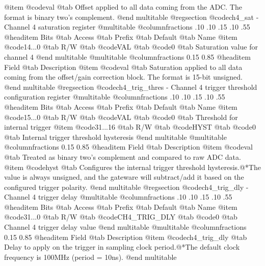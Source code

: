 @item @code{val} @tab Offset applied to all data coming from the ADC. The format is binary two's complement.
@end multitable
@regsection @code{ch4_sat} - Channel 4 saturation register
@multitable @columnfractions .10 .10 .15 .10 .55
@headitem Bits @tab Access @tab Prefix @tab Default @tab Name
@item @code{14...0}
@tab R/W @tab
@code{VAL}
@tab @code{0} @tab 
Saturation value for channel 4
@end multitable
@multitable @columnfractions 0.15 0.85
@headitem Field @tab Description
@item @code{val} @tab Saturation applied to all data coming from the offset/gain correction block. The format is 15-bit unsigned.
@end multitable
@regsection @code{ch4_trig_thres} - Channel 4 trigger threshold configuration register
@multitable @columnfractions .10 .10 .15 .10 .55
@headitem Bits @tab Access @tab Prefix @tab Default @tab Name
@item @code{15...0}
@tab R/W @tab
@code{VAL}
@tab @code{0} @tab 
Threshold for internal trigger
@item @code{31...16}
@tab R/W @tab
@code{HYST}
@tab @code{0} @tab 
Internal trigger threshold hysteresis
@end multitable
@multitable @columnfractions 0.15 0.85
@headitem Field @tab Description
@item @code{val} @tab Treated as binary two's complement and compared to raw ADC data.
@item @code{hyst} @tab Configures the internal trigger threshold hysteresis.@*The value is always unsigned, and the gateware will subtract/add it based on the configured trigger polarity.
@end multitable
@regsection @code{ch4_trig_dly} - Channel 4 trigger delay
@multitable @columnfractions .10 .10 .15 .10 .55
@headitem Bits @tab Access @tab Prefix @tab Default @tab Name
@item @code{31...0}
@tab R/W @tab
@code{CH4_TRIG_DLY}
@tab @code{0} @tab 
Channel 4 trigger delay value
@end multitable
@multitable @columnfractions 0.15 0.85
@headitem Field @tab Description
@item @code{ch4_trig_dly} @tab Delay to apply on the trigger in sampling clock period.@*The default clock frequency is 100MHz (period = 10ns).
@end multitable
